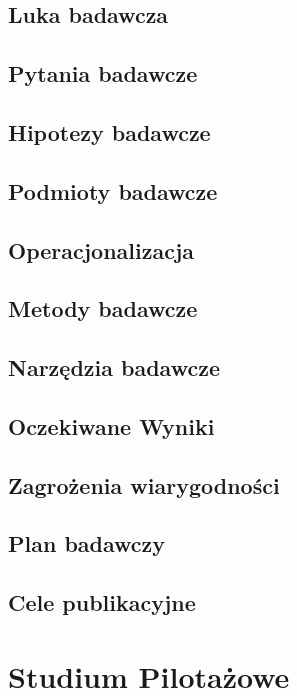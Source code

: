 \documentclass[polish,envcountsect,10pt]{article}
\begin{document}
\subsection{Luka badawcza}

\subsection{Pytania badawcze}

\subsection{Hipotezy badawcze}

\subsection{Podmioty badawcze} 

\subsection{Operacjonalizacja}

\subsection{Metody badawcze}

\subsection{Narzędzia badawcze}

\subsection{Oczekiwane Wyniki}

\subsection{Zagrożenia wiarygodności}

\subsection{Plan badawczy}

\subsection{Cele publikacyjne}


\section{Studium Pilotażowe}
\end{document}
